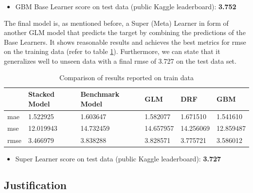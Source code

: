 \documentclass{article}
\begin{document}
\begin{itemize}
    \item GBM Base Learner score on test data (public Kaggle leaderboard): \textbf{3.752}
\end{itemize}

The final model is, as mentioned before, a Super (Meta) Learner in form of another GLM model that predicts the target by combining the predictions of the Base Learners. It shows reasonable results and achieves the best metrics for rmse on the training data (refer to table \ref{tab:train_comparison}). Furthermore, we can state that it generalizes well to unseen data with a final rmse of 3.727 on the test data set.

\begin{table}[h]
 \caption{Comparison of results reported on train data}
  \centering
  \begin{tabular}{llllll}
    \toprule
     &          Stacked Model & Benchmark Model & GLM & DRF & GBM \\
    \midrule
    mae&        1.522925&1.603647&1.582077&1.671510&1.541610\\
    mse&        12.019943&14.732459&14.657957&14.256069&12.859487\\
    rmse&       3.466979&3.838288&3.828571&3.775721&3.586012\\
    \bottomrule
  \end{tabular}
  \label{tab:train_comparison}
\end{table}

\begin{itemize}
    \item Super Learner score on test data (public Kaggle leaderboard): \textbf{3.727}
\end{itemize}

\subsection{Justification}

\end{document}
